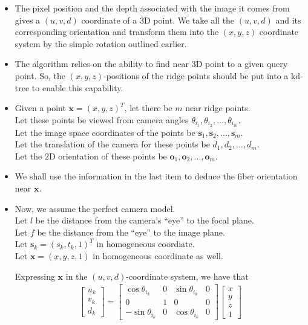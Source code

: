 \documentclass[10pt]{article}
\newcommand{\ve}[1]{\mathbf{#1}}
\begin{document}
	  \begin{itemize}
	    \item The pixel position and the depth associated with the image it comes from gives a $(u,v,d)$ coordinate of a 3D point. We take all the $(u,v,d)$ and its corresponding orientation and transform them into the $(x,y,z)$ coordinate system by the simple rotation outlined earlier.
	    
	    \item The algorithm relies on the ability to find near 3D point to a given query point. So, the $(x,y,z)$-positions of the ridge points should be put into a kd-tree to enable this capability.
	    
	    \item Given a point $\ve{x} = (x,y,z)^T$, let there be $m$ near ridge points.\\
	    Let these points be viewed from camera angles $\theta_{i_1}, \theta_{i_2}, \dotsc, \theta_{i_m}$.\\
	    Let the image space coordinates of the points be $\ve{s}_1, \ve{s}_2, \dotsc, \ve{s}_m$.\\
	    Let the translation of the camera for these points be $d_1, d_2, \dotsc, d_m$.\\
	    Let the 2D orientation of these points be $\ve{o}_1, \ve{o}_2, \dotsc, \ve{o}_m$.

	    \item We shall use the information in the last item to deduce the fiber orientation near $\ve{x}$.

	    \item Now, we assume the perfect camera model.\\
	    Let $l$ be the distance from the camera's ``eye'' to the focal plane.\\
	    Let $f$ be the distance from the ``eye'' to the image plane.\\
	    Let $\ve{s}_k = (s_k, t_k, 1)^T$ in homogeneous coordiate.\\
	    Let $\ve{x} = (x, y, z, 1)$ in homogeneous coordinate as well.

	    Expressing $\ve{x}$ in the $(u,v,d)$-coordinate system, we have that
	    \begin{align*}
	    	\begin{bmatrix}
	    		u_k \\ v_k \\ d_k
	    	\end{bmatrix}
	    	=
	    	\begin{bmatrix}
	    		\cos \theta_{i_k} & 0 & \sin \theta_{i_k} & 0\\
	    		0 & 1 & 0 & 0\\
	    		-\sin \theta_{i_k} & 0 & \cos \theta_{i_k} & 0
	    	\end{bmatrix}
	    	\begin{bmatrix}
	    		x \\ y \\ z \\ 1	    		
	    	\end{bmatrix}
	    \end{align*}


\end{itemize}
\end{document}
